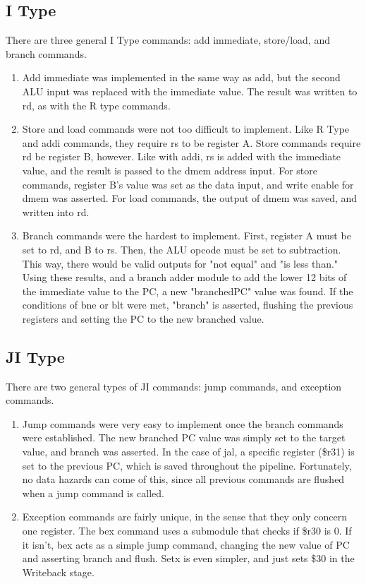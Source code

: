 \documentclass[letterpaper]{article} %
\begin{document}
\subsection*{I Type}
There are three general I Type commands: add immediate, store/load, and branch commands.
\begin{enumerate}
\item Add immediate was implemented in the same way as add, but the second ALU input was replaced with the immediate value. The result was written to rd, as with the R type commands.
\item Store and load commands were not too difficult to implement. Like R Type and addi commands, they require rs to be register A. Store commands require rd be register B, however. Like with addi, rs is added with the immediate value, and the result is passed to the dmem address input. For store commands, register B's value was set as the data input, and write enable for dmem was asserted. For load commands, the output of dmem was saved, and written into rd.
\item Branch commands were the hardest to implement. First, register A must be set to rd, and B to rs. Then, the ALU opcode must be set to subtraction. This way, there would be valid outputs for "not equal" and "is less than." Using these results, and a branch adder module to add the lower 12 bits of the immediate value to the PC, a new "branchedPC" value was found. If the conditions of bne or blt were met, "branch" is asserted, flushing the previous registers and setting the PC to the new branched value. 
\end{enumerate}

\subsection*{JI Type}
There are two general types of JI commands: jump commands, and exception commands.
\begin{enumerate}
\item Jump commands were very easy to implement once the branch commands were established. The new branched PC value was simply set to the target value, and branch was asserted. In the case of jal, a specific register (\$r31) is set to the previous PC, which is saved throughout the pipeline. Fortunately, no data hazards can come of this, since all previous commands are flushed when a jump command is called.
\item Exception commands are fairly unique, in the sense that they only concern one register. The bex command uses a submodule that checks if \$r30 is 0. If it isn't, bex acts as a simple jump command, changing the new value of PC and asserting branch and flush. Setx is even simpler, and just sets \$30 in the Writeback stage.
\end{enumerate}
\end{document}
